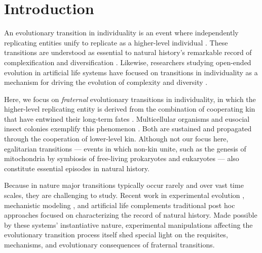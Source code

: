 \section{Introduction}

An evolutionary transition in individuality is an event where independently replicating entities unify to replicate as a higher-level individual \citep{smith1997major}.
These transitions are understood as essential to natural history's remarkable record of complexification and diversification \citep{smith1997major}.
Likewise, researchers studying open-ended evolution in artificial life systems have focused on transitions in individuality as a mechanism for driving the evolution of complexity and diversity \citep{taylor2016open, banzhaf2016defining}.

Here, we focus on \textit{fraternal} evolutionary transitions in individuality, in which the higher-level replicating entity is derived from the combination of cooperating kin that have entwined their long-term fates \citep{west2015major}.
Multicellular organisms and eusocial insect colonies exemplify this phenomenon \citep{smith1997major}.
Both are sustained and propagated through the cooperation of lower-level kin.
Although not our focus here, egalitarian transitions --- events in which non-kin unite, such as the genesis of mitochondria by symbiosis of free-living prokaryotes and eukaryotes \citep{smith1997major} --- also constitute essential episodes in natural history.

Because in nature major transitions typically occur rarely and over vast time scales, they are challenging to study.
Recent work in experimental evolution \citep{ratcliff2014experimental, ratcliff2015origins, gulli2019evolution, koschwanez2013improved}, mechanistic modeling \citep{hanschen2015evolutionary, staps2019emergence}, and artificial life \citep{goldsby2012task, goldsby2014evolutionary} complements traditional post hoc approaches focused on characterizing the record of natural history.
Made possible by these systems' instantiative nature, experimental manipulations affecting the evolutionary transition process itself shed special light on the requisites, mechanisms, and evolutionary consequences of fraternal transitions.


